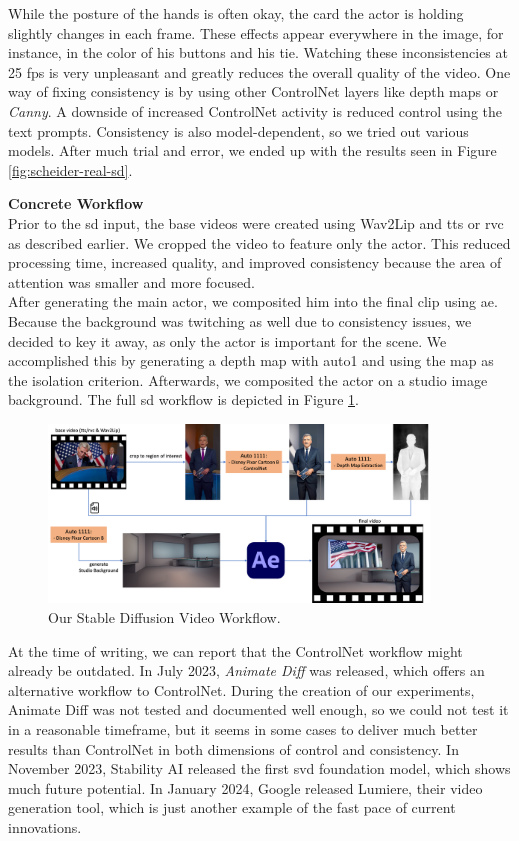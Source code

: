 \documentclass[
  a4paper,  %
  twoside,  %
  bibliography=totoc,
  headsepline,
  cleardoublepage=empty,
  parskip=half,
  draft=false
]{scrbook}
\begin{document}
While the posture of the hands is often okay, the card the actor is holding slightly changes in each frame. These effects appear everywhere in the image, for instance, in the color of his buttons and his tie. Watching these inconsistencies at 25 \gls{fps} is very unpleasant and greatly reduces the overall quality of the video. One way of fixing consistency is by using other ControlNet layers like depth maps or \textit{Canny}. A downside of increased ControlNet activity is reduced control using the text prompts. Consistency is also model-dependent, so we tried out various models. After much trial and error, we ended up with the results seen in Figure \ref{fig:scheider-real-sd}.

\textbf{Concrete Workflow} \\
Prior to the \gls{sd} input, the base videos were created using Wav2Lip and \gls{tts} or \gls{rvc} as described earlier. We cropped the video to feature only the actor. This reduced processing time, increased quality, and improved consistency because the area of attention was smaller and more focused. \\
After generating the main actor, we composited him into the final clip using \gls{ae}. Because the background was  twitching as well due to consistency issues, we decided to key it away, as only the actor is important for the scene. We accomplished this by generating a depth map with \gls{auto1} and using the map as the isolation criterion. Afterwards, we composited the actor on a studio image background. The full \gls{sd} workflow is depicted in Figure \ref{fig:sd-full-workflow}.

\begin{figure}[h]
  \centering
  \includegraphics[width=0.9\textwidth]{./graphics/diffusion/sd-workflow.png}
  \caption{Our Stable Diffusion Video Workflow.}
  \label{fig:sd-full-workflow}
\end{figure}

At the time of writing, we can report that the ControlNet workflow might already be outdated. In July 2023, \textit{Animate Diff} was released, which offers an alternative workflow to ControlNet. During the creation of our experiments, Animate Diff was not tested and documented well enough, so we could not test it in a reasonable timeframe, but it seems in some cases to deliver much better results than ControlNet in both dimensions of control and consistency. In November 2023, Stability AI released the first \gls{svd} foundation model, which shows much future potential. In January 2024, Google released Lumiere, their video generation tool, which is just another example of the fast pace of current innovations.
\end{document}
